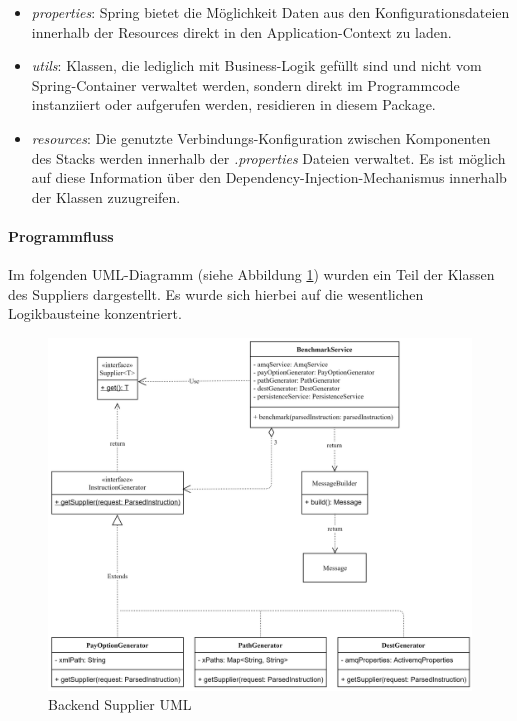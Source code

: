 \begin{itemize}
  \item \emph{properties}: Spring bietet die Möglichkeit Daten aus den Konfigurationsdateien innerhalb der Resources direkt in den Application-Context zu laden.
  
  \item \emph{utils}: Klassen, die lediglich mit Business-Logik gefüllt sind und nicht vom Spring-Container verwaltet werden, sondern direkt im Programmcode instanziiert oder aufgerufen werden, residieren in diesem Package.
  
  \item \emph{resources}: Die genutzte Verbindungs-Konfiguration zwischen Komponenten des Stacks werden innerhalb der \emph{.properties} Dateien verwaltet. Es ist möglich auf diese Information über den Dependency-Injection-Mechanismus innerhalb der Klassen zuzugreifen.

\end{itemize}
\paragraph{Programmfluss \checkmark}
Im folgenden UML-Diagramm (siehe Abbildung \ref{fig:supplierUml}) wurden ein Teil der Klassen des Suppliers dargestellt. Es wurde sich hierbei auf die wesentlichen Logikbausteine konzentriert. 

\begin{figure}[ht!]
	\centering
	\includegraphics[width=\linewidth]{kapitel/problemloesung/implementierung/_img/supplier-uml}
	\caption[Backend Supplier UML]{Backend Supplier UML}
	\label{fig:supplierUml}
\end{figure}

